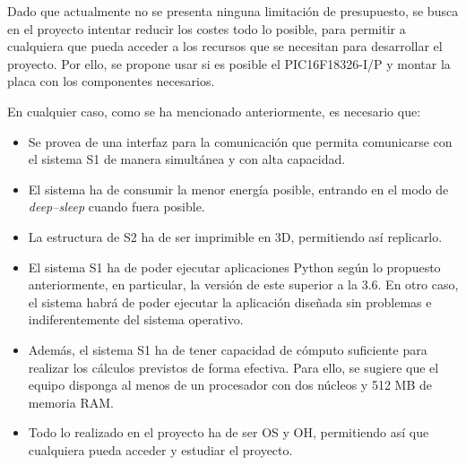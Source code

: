 Dado que actualmente no se presenta ninguna limitación de presupuesto, se busca en el proyecto intentar reducir los costes todo lo posible, para permitir a cualquiera que pueda acceder a los recursos que se necesitan para desarrollar el proyecto. Por ello, se propone usar si es posible el PIC16F18326-I/P y montar la placa con los componentes necesarios.

En cualquier caso, como se ha mencionado anteriormente, es necesario que:

\begin{itemize}
    \item Se provea de una interfaz para la comunicación que permita comunicarse con el sistema \ac{S1} de manera simultánea y con alta capacidad.
    \item El sistema ha de consumir la menor energía posible, entrando en el modo de \textit{deep--sleep} cuando fuera posible.
    \item La estructura de \ac{S2} ha de ser imprimible en 3D, permitiendo así replicarlo.
    \item El sistema \ac{S1} ha de poder ejecutar aplicaciones Python según lo propuesto anteriormente, en particular, la versión de este superior a la 3.6. En otro caso, el sistema habrá de poder ejecutar la aplicación diseñada sin problemas e indiferentemente del sistema operativo.
    \item Además, el sistema \ac{S1} ha de tener capacidad de cómputo suficiente para realizar los cálculos previstos de forma efectiva. Para ello, se sugiere que el equipo disponga al menos de un procesador con dos núcleos y 512 MB de memoria RAM.
    \item Todo lo realizado en el proyecto ha de ser \ac{OS} y \ac{OH}, permitiendo así que cualquiera pueda acceder y estudiar el proyecto.
\end{itemize}